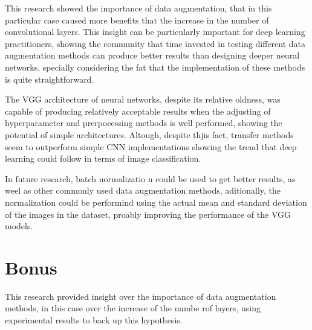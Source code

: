 \documentclass[10pt,twocolumn,letterpaper]{article}
\begin{document}
This research showed the importance of data augmentation, that in this particular case caused more benefits that the increase in the number of convolutional layers. This insight can be particularly  important for deep learning practitioners, showing the community that time invested in testing different data augmentation methods can produce better results than designing deeper neural networks, specially considering the fat that the implementation of these methods is quite straightforward.

The VGG architecture of neural networks, despite its relative oldness, was capable of producing relatively acceptable results when the adjusting of hyperparameter and prerpocessing methods is well performed, showing the potential of simple architectures. Altough, despite thjis fact, transfer methods seem to outperform simple CNN implementations showing the trend that deep learning could follow in terms of image classification.

In future research, batch normalizatio n could be used to get better results, as weel as other commonly used data augmentation methods, aditionally, the normalization could be performind using the actual mean and standard deviation of the images in the dataset, proably improving the performance of the VGG models.

\section{Bonus}

This research provided insight over the importance of data augmentation methods, in this case over the increase of the numbe rof layers, using experimental results to back up this hypothesis.

{\small


}
\end{document}
